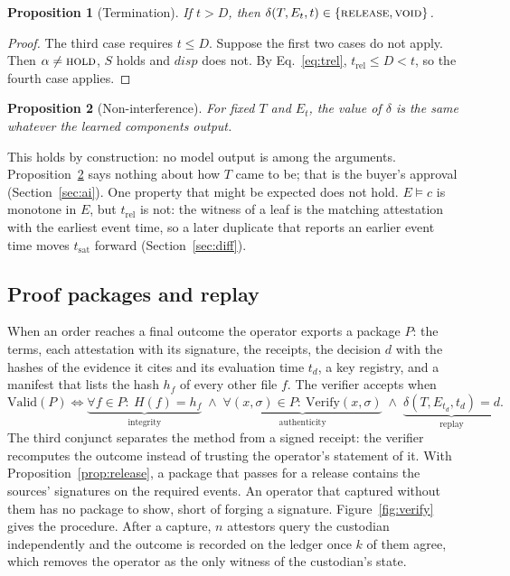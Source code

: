 \documentclass[10pt,a4paper]{article}
\newcommand{\rel}{\textup{\textsc{release}}}
\newcommand{\void}{\textup{\textsc{void}}}
\newcommand{\hold}{\textup{\textsc{hold}}}
\theoremstyle{tight}
\newtheorem{proposition}{Proposition}
\begin{document}
\begin{proposition}[Termination]\label{prop:term}
If $t > D$, then $\delta(T,E_t,t) \in \{\rel, \void\}$.
\end{proposition}
\begin{proof}
The third case requires $t \le D$. Suppose the first two cases do not apply. Then $\alpha \neq \hold$, $S$ holds and
$\mathit{disp}$ does not. By Eq.~\eqref{eq:trel}, $t_{\mathrm{rel}} \le D < t$, so the fourth case applies.
\end{proof}

\begin{proposition}[Non-interference]\label{prop:ni}
For fixed $T$ and $E_t$, the value of $\delta$ is the same whatever the learned components output.
\end{proposition}
\noindent This holds by construction: no model output is among the arguments. Proposition~\ref{prop:ni} says nothing
about how $T$ came to be; that is the buyer's approval (Section~\ref{sec:ai}). One property that might be expected
does not hold. $E \models c$ is monotone in $E$, but $t_{\mathrm{rel}}$ is not: the witness of a leaf is the matching
attestation with the earliest event time, so a later duplicate that reports an earlier event time moves
$t_{\mathrm{sat}}$ forward (Section~\ref{sec:diff}).

\subsection{Proof packages and replay}

When an order reaches a final outcome the operator exports a package $P$: the terms, each attestation with its
signature, the receipts, the decision $d$ with the hashes of the evidence it cites and its evaluation time $t_d$, a
key registry, and a manifest that lists the hash $h_f$ of every other file $f$. The verifier accepts when
\begin{equation}\label{eq:verify}
\mathrm{Valid}(P) \iff \underbrace{\forall f \in P:\ H(f) = h_f}_{\text{integrity}} \;\wedge\;
\underbrace{\forall (x,\sigma) \in P:\ \mathrm{Verify}(x,\sigma)}_{\text{authenticity}} \;\wedge\;
\underbrace{\delta(T, E_{t_d}, t_d) = d}_{\text{replay}}.
\end{equation}
The third conjunct separates the method from a signed receipt: the verifier recomputes the outcome instead of
trusting the operator's statement of it. With Proposition~\ref{prop:release}, a package that passes for a release
contains the sources' signatures on the required events. An operator that captured without them has no package to
show, short of forging a signature. Figure~\ref{fig:verify} gives the procedure. After a capture, $n$ attestors query
the custodian independently and the outcome is recorded on the ledger once $k$ of them agree, which removes the
operator as the only witness of the custodian's state.
\end{document}
